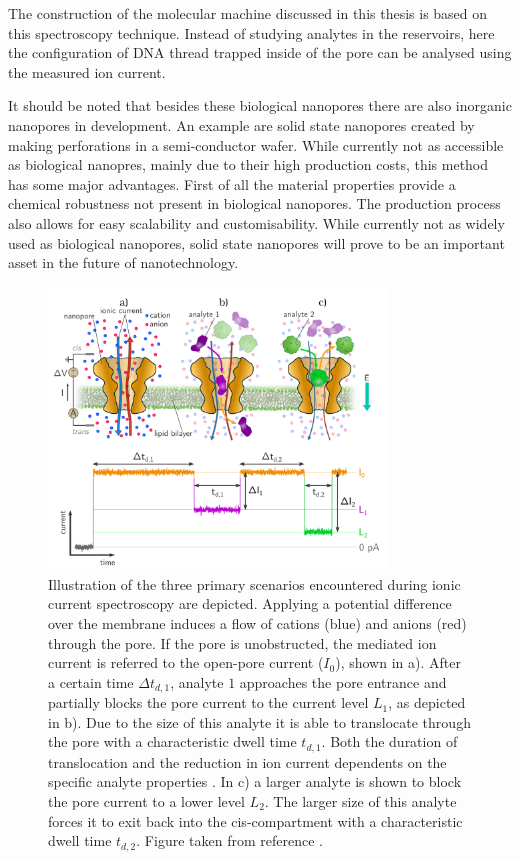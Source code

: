 The construction of the molecular machine discussed in this thesis is based on this
spectroscopy technique. Instead of studying analytes in the reservoirs, here
the configuration of DNA thread trapped inside of the pore can be analysed using the
measured ion current.

It should be noted that besides these biological nanopores there are also inorganic
nanopores in development.\cite{Dekker2007} An example are solid state nanopores created
by making perforations in a semi-conductor wafer. While currently not as accessible as
biological nanopres, mainly due to their high production costs, this method has some
major advantages.  First of all the material properties provide a chemical robustness not
present in biological nanopores. The production process also allows for easy scalability
and customisability. While currently not as widely used as biological nanopores, solid
state nanopores will prove to be an important asset in the future of nanotechnology.

\begin{figure}[htpb!]
  \centering
  \includegraphics[width=0.72\linewidth, height=7.5cm]{Figures/IonicCurrentSpec2.png}
  \caption[Detailed illustration of ionic current spectroscopy.]{\linespread{0.1}
    {\linespread{0.1}\small  Illustration of the three primary scenarios encountered
      during ionic current
spectroscopy are depicted. Applying a potential difference over the membrane induces a
flow of cations (blue) and anions (red)
through the pore. If the pore is unobstructed, the mediated ion current is referred to
the open-pore current ($I_0$), shown in a). After a certain time $\Delta t_{d,1}$,
analyte $1$ approaches the pore entrance and partially blocks the pore current to the
current level $L_1$, as depicted in b). Due to the size of this analyte it is able to
translocate through the pore with a characteristic dwell time $t_{d,1}$. Both the
duration of translocation and the reduction in ion current dependents on the
specific analyte properties . In c) a larger analyte is shown to block the pore current
to a lower level $L_2$. The larger size of this analyte forces it to exit back into the
cis-compartment with a characteristic dwell time $t_{d,2}$. Figure taken from reference
\cite{willems2021}.
}}
  \label{fig:IonicCurrentSpec}
\end{figure}




